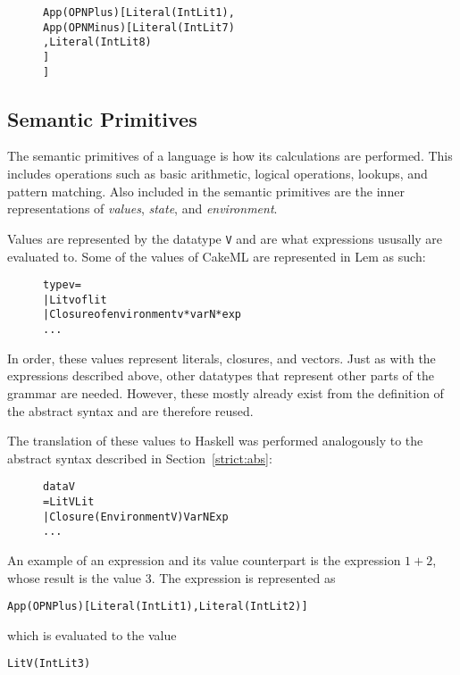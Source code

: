 \begin{figure}[H]
\begin{alltt}
  App (OPN Plus) [Literal (IntLit 1),
                  App (OPN Minus) [Literal (IntLit 7)
                                  ,Literal (IntLit 8)
                                  ]
                 ]
\end{alltt}
\end{figure}

\subsection{Semantic Primitives}
The semantic primitives of a language is how its calculations are performed.
This includes operations such as basic arithmetic, logical operations,
lookups, and pattern matching. Also included in the semantic primitives are
the inner representations of \textit{values}, \textit{state}, and
\textit{environment}.

Values are represented by the datatype \texttt{V} and are what expressions
ususally are evaluated to. Some of the values of CakeML are represented in
Lem as such:

\begin{figure}[H]
\begin{alltt}
  type v =
    | Litv of lit
    | Closure of environment v * varN * exp
    ...
\end{alltt}
\end{figure}

\noindent In order, these values represent literals, closures, and vectors.
Just as with the expressions described above, other datatypes that represent
other parts of the grammar are needed. However, these mostly already exist from
the definition of the abstract syntax and are therefore reused.

The translation of these values to Haskell was performed analogously to the
abstract syntax described in Section~\ref{strict:abs}:

\begin{figure}[H]
\begin{alltt}
  data V
    = LitV Lit
    | Closure (Environment V) VarN Exp
    ...
\end{alltt}
\end{figure}

An example of an expression and its value counterpart is the expression $1 + 2$,
whose result is the value 3. The expression is represented as
\begin{alltt}
  App (OPN Plus) [Literal (IntLit 1), Literal (IntLit 2)]
\end{alltt}
which is evaluated to the value
\begin{alltt}
  LitV (IntLit 3)
\end{alltt}

